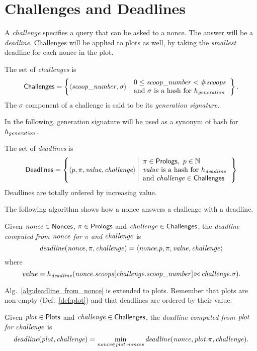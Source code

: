 \section{Challenges and Deadlines}\label{sec:challenges_and_deadlines}

A \emph{challenge} specifies a query that can be asked to a nonce.
The answer will be a \emph{deadline}.
Challenges will be applied to plots as well, by taking
the \emph{smallest} deadline for each nonce in the plot.
%
\begin{definition}[Challenge]\label{def:challenge}
  The set of \emph{challenges} is
  \[
  {\mathsf{Challenges}}=\left\{\langle{\mathit{scoop\_number}},\sigma\rangle\left|
  \begin{array}{l}
    0\le{\mathit{scoop\_number}}<{\#\mathit{scoops}}\\
    \text{and $\sigma$ is a hash for $h_{\mathit{generation}}$}
  \end{array}
  \right.\right\}.
  \]
  The $\sigma$ component of a challenge is said to be its \emph{generation signature}.
\end{definition}
%
In the following, generation signature will be used as a synonym of hash for $h_{\mathit{generation}}$.
%
\begin{definition}[Deadline]\label{def:deadline}
  The set of \emph{deadlines} is
  \[
  {\mathsf{Deadlines}}=\left\{
  \langle p,\pi,\mathit{value},{\mathit{challenge}}\rangle
  \left|\begin{array}{l}
  \pi\in{\mathsf{Prologs}},\ p\in\mathbb{N}\\
  \mathit{value}\text{ is a hash for }h_{\mathit{deadline}}\\
  \text{and }{\mathit{challenge}}\in{\mathsf{Challenges}}
  \end{array}
  \right.
  \right\}
  \]
  Deadlines are totally ordered by increasing value.
\end{definition}
%
The following algorithm shows how a nonce answers a challenge with a deadline.
%
\begin{alg}[$\deadline(\nonce,\pi,\challenge)$]\label{alg:deadline_from_nonce}
  Given ${\mathit{nonce}}\in{\mathsf{Nonces}}$, $\pi\in{\mathsf{Prologs}}$ and ${\mathit{challenge}}\in{\mathsf{Challenges}}$, the
  \emph{deadline computed from ${\mathit{nonce}}$ for $\pi$ and ${\mathit{challenge}}$} is
  \[
  {\mathit{deadline}}({\mathit{nonce}},\pi,{\mathit{challenge}})=\langle{\mathit{nonce}}.p,\pi,\mathit{value},{\mathit{challenge}}\rangle
  \]
  where
  \[
  \mathit{value}=h_{\mathit{deadline}}({\mathit{nonce}}.{\mathit{scoops}}[{\mathit{challenge}}.{\mathit{scoop\_number}}]\operatorname*{\bowtie}{\mathit{challenge}}.\sigma).
  \]
\end{alg}
%
Alg.~\ref{alg:deadline_from_nonce} is extended to plots. Remember that plots are non-empty
(Def.~\ref{def:plot}) and that deadlines are ordered by their value.
%
\begin{alg}[$\deadline(\plot,\challenge)$]\label{alg:deadline_from_plot}
  Given ${\mathit{plot}}\in{\mathsf{Plots}}$ and ${\mathit{challenge}}\in{\mathsf{Challenges}}$, the \emph{deadline computed
  from ${\mathit{plot}}$ for ${\mathit{challenge}}$} is
  \[
  {\mathit{deadline}}({\mathit{plot}},{\mathit{challenge}})=\min\limits_{{\mathit{nonce}}\in{\mathit{plot}}.{\mathit{nonces}}}{\mathit{deadline}}({\mathit{nonce}},{\mathit{plot}}.\pi,{\mathit{challenge}}).
  \]
\end{alg}
